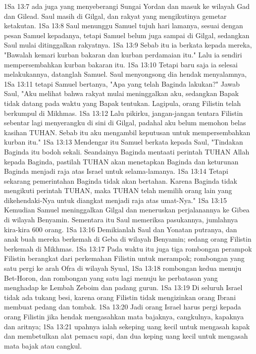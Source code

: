 1Sa 13:7  ada juga yang menyeberangi Sungai Yordan dan masuk ke wilayah Gad dan Gilead. Saul masih di Gilgal, dan rakyat yang mengikutinya gemetar ketakutan.
1Sa 13:8  Saul menunggu Samuel tujuh hari lamanya, sesuai dengan pesan Samuel kepadanya, tetapi Samuel belum juga sampai di Gilgal, sedangkan Saul mulai ditinggalkan rakyatnya.
1Sa 13:9  Sebab itu ia berkata kepada mereka, "Bawalah kemari kurban bakaran dan kurban perdamaian itu." Lalu ia sendiri mempersembahkan kurban bakaran itu.
1Sa 13:10  Tetapi baru saja ia selesai melakukannya, datanglah Samuel. Saul menyongsong dia hendak menyalamnya,
1Sa 13:11  tetapi Samuel bertanya, "Apa yang telah Baginda lakukan?" Jawab Saul, "Aku melihat bahwa rakyat mulai meninggalkan aku, sedangkan Bapak tidak datang pada waktu yang Bapak tentukan. Lagipula, orang Filistin telah berkumpul di Mikhmas.
1Sa 13:12  Lalu pikirku, jangan-jangan tentara Filistin sebentar lagi menyerangku di sini di Gilgal, padahal aku belum memohon belas kasihan TUHAN. Sebab itu aku mengambil keputusan untuk mempersembahkan kurban itu."
1Sa 13:13  Mendengar itu Samuel berkata kepada Saul, "Tindakan Baginda itu bodoh sekali. Seandainya Baginda mentaati perintah TUHAN Allah kepada Baginda, pastilah TUHAN akan menetapkan Baginda dan keturunan Baginda menjadi raja atas Israel untuk selama-lamanya.
1Sa 13:14  Tetapi sekarang pemerintahan Baginda tidak akan bertahan. Karena Baginda tidak mengikuti perintah TUHAN, maka TUHAN telah memilih orang lain yang dikehendaki-Nya untuk diangkat menjadi raja atas umat-Nya."
1Sa 13:15  Kemudian Samuel meninggalkan Gilgal dan meneruskan perjalanannya ke Gibea di wilayah Benyamin. Sementara itu Saul memeriksa pasukannya, jumlahnya kira-kira 600 orang.
1Sa 13:16  Demikianlah Saul dan Yonatan putranya, dan anak buah mereka berkemah di Geba di wilayah Benyamin; sedang orang Filistin berkemah di Mikhmas.
1Sa 13:17  Pada waktu itu juga tiga rombongan perampok Filistin berangkat dari perkemahan Filistin untuk merampok; rombongan yang satu pergi ke arah Ofra di wilayah Syual,
1Sa 13:18  rombongan kedua menuju Bet-Horon, dan rombongan yang satu lagi menuju ke perbatasan yang menghadap ke Lembah Zeboim dan padang gurun.
1Sa 13:19  Di seluruh Israel tidak ada tukang besi, karena orang Filistin tidak mengizinkan orang Ibrani membuat pedang dan tombak.
1Sa 13:20  Jadi orang Israel harus pergi kepada orang Filistin jika hendak mengasahkan mata bajaknya, cangkulnya, kapaknya dan aritnya;
1Sa 13:21  upahnya ialah sekeping uang kecil untuk mengasah kapak dan membetulkan alat pemacu sapi, dan dua keping uang kecil untuk mengasah mata bajak atau cangkul.
